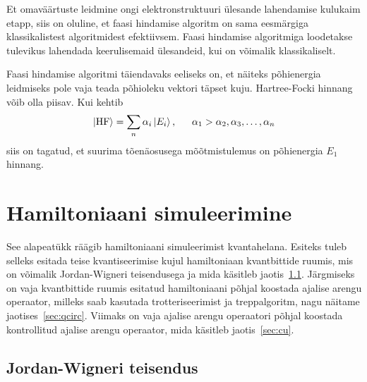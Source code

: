 \documentclass[12pt]{report}
\def\ket#1{\left|#1\right>}
\begin{document}
Et omaväärtuste leidmine ongi elektronstruktuuri ülesande lahendamise kulukaim etapp, siis on oluline, et faasi hindamise algoritm on sama eesmärgiga klassikalistest algoritmidest efektiivsem.
Faasi hindamise algoritmiga loodetakse tulevikus lahendada keerulisemaid ülesandeid, kui on võimalik klassikaliselt.

Faasi hindamise algoritmi täiendavaks eeliseks on, et näiteks põhienergia leidmiseks pole vaja teada põhioleku vektori täpset kuju.
Hartree-Focki hinnang võib olla piisav.
Kui kehtib
\begin{align}
    \ket{\text{HF}} = \sum_n \alpha_i \ket{E_i} \rlap{,}
    \qquad \alpha_1 > \alpha_2, \alpha_3, \ldots, \alpha_n
\end{align}
siis on tagatud, et suurima tõenäosusega mõõtmistulemus on põhienergia \(E_1\) hinnang.

\section{Hamiltoniaani simuleerimine}\label{sec:hamsim}

See alapeatükk räägib hamiltoniaani simuleerimist kvantahelana.
Esiteks tuleb selleks esitada teise kvantiseerimise kujul hamiltoniaan kvantbittide ruumis, mis on võimalik Jordan-Wigneri teisendusega ja mida käsitleb jaotis~\ref{sec:jw}.
Järgmiseks on vaja kvantbittide ruumis esitatud hamiltoniaani põhjal koostada ajalise arengu operaator, milleks saab kasutada trotteriseerimist ja treppalgoritm, nagu näitame jaotises~\ref{sec:qcirc}.
Viimaks on vaja ajalise arengu operaatori põhjal koostada kontrollitud ajalise arengu operaator, mida käsitleb jaotis~\ref{sec:cu}.

\subsection{Jordan-Wigneri teisendus}\label{sec:jw}
\end{document}
